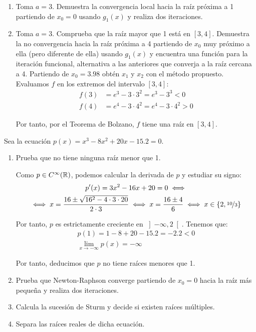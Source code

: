 \begin{ejercicio}
\begin{enumerate}
        
        \item Toma $a = 3$. Demuestra la convergencia local hacia la raíz próxima a 1 partiendo de $x_0 = 0$ usando $g_1(x)$ y realiza dos iteraciones.
        \item Toma $a = 3$. Comprueba que la raíz mayor que 1 está en $[3, 4]$. Demuestra la no convergencia hacia la raíz próxima a 4 partiendo de $x_0$ muy próximo a ella (pero diferente de ella) usando $g_1(x)$ y encuentra una función para la iteración funcional, alternativa a las anteriores que converja a la raíz cercana a 4. Partiendo de $x_0 = 3.98$ obtén $x_1$ y $x_2$ con el método propuesto.\\
        
        Evaluamos $f$ en los extremos del intervalo $[3,4]$:
        \begin{align*}
            f(3) &= e^3 - 3\cdot 3^2 = e^3 - 3^3<0\\
            f(4) &= e^4 - 3\cdot 4^2 = e^4 - 3\cdot 4^2>0
        \end{align*}

        Por tanto, por el Teorema de Bolzano, $f$ tiene una raíz en $[3,4]$.
    \end{enumerate}
\end{ejercicio}

\begin{ejercicio}
    Sea la ecuación $p(x) = x^3 - 8x^2 + 20x - 15.2 = 0$.
    \begin{enumerate}
        \item Prueba que no tiene ninguna raíz menor que 1.
        
        Como $p\in C^\infty(\mathbb{R})$, podemos calcular la derivada de $p$ y estudiar su signo:
        \begin{multline*}
            p'(x) = 3x^2 - 16x + 20 = 0
            \iff \\ \iff x = \frac{16 \pm \sqrt{16^2 - 4\cdot 3\cdot 20}}{2\cdot 3}
            \iff x = \frac{16 \pm 4}{6}
            \iff x\in \{2, \nicefrac{10}{3}\}
        \end{multline*}

        Por tanto, $p$ es estrictamente creciente en $\left]-\infty, 2\right[$. Tenemos que:
        \begin{align*}
            p(1)=1-8+20-15.2= -2.2 < 0\\
            \lim_{x\to -\infty} p(x) = -\infty
        \end{align*}

        Por tanto, deducimos que $p$ no tiene raíces menores que 1.

        \item Prueba que Newton-Raphson converge partiendo de $x_0 = 0$ hacia la raíz más pequeña y realiza dos iteraciones.
        \item Calcula la sucesión de Sturm y decide si existen raíces múltiples.
        \item Separa las raíces reales de dicha ecuación.
    \end{enumerate}
\end{ejercicio}

